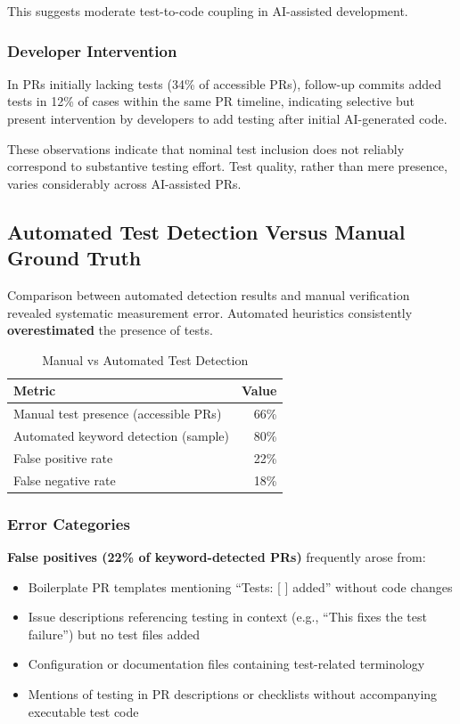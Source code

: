 \documentclass[conference]{IEEEtran}
\begin{document}
This suggests moderate test-to-code coupling in AI-assisted development.

\subsubsection{Developer Intervention}

In PRs initially lacking tests (34\% of accessible PRs), follow-up commits added tests in 12\% of cases within the same PR timeline, indicating selective but present intervention by developers to add testing after initial AI-generated code.

These observations indicate that nominal test inclusion does not reliably correspond to substantive testing effort. Test quality, rather than mere presence, varies considerably across AI-assisted PRs.

\subsection{Automated Test Detection Versus Manual Ground Truth}

Comparison between automated detection results and manual verification revealed systematic measurement error. Automated heuristics consistently \textbf{overestimated} the presence of tests.

\begin{table}[t]
\centering
\caption{Manual vs Automated Test Detection}
\label{tab:detection_comparison}
\begin{tabular}{@{}lr@{}}
\toprule
\textbf{Metric} & \textbf{Value} \\
\midrule
Manual test presence (accessible PRs) & 66\% \\
Automated keyword detection (sample) & 80\% \\
False positive rate & 22\% \\
False negative rate & 18\% \\
\bottomrule
\end{tabular}
\end{table}

\subsubsection{Error Categories}

\textbf{False positives (22\% of keyword-detected PRs)} frequently arose from:
\begin{itemize}
    \item Boilerplate PR templates mentioning ``Tests: [ ] added'' without code changes
    \item Issue descriptions referencing testing in context (e.g., ``This fixes the test failure'') but no test files added
    \item Configuration or documentation files containing test-related terminology
    \item Mentions of testing in PR descriptions or checklists without accompanying executable test code
\end{itemize}
\end{document}
